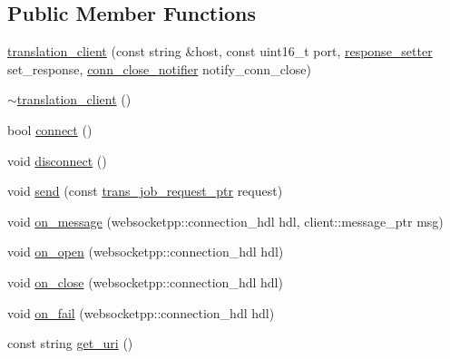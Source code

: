 \subsection*{Public Member Functions}
\begin{DoxyCompactItemize}
\item 
\hyperlink{classuva_1_1smt_1_1bpbd_1_1client_1_1translation__client_ae892d7cccc21df88b04e9d26c4f8c23c}{translation\+\_\+client} (const string \&host, const uint16\+\_\+t port, \hyperlink{classuva_1_1smt_1_1bpbd_1_1client_1_1translation__client_aee49acfd2764e30f042c29b1d365f21d}{response\+\_\+setter} set\+\_\+response, \hyperlink{classuva_1_1smt_1_1bpbd_1_1client_1_1translation__client_a6bb76738c95be98f5d13370d8e6a1176}{conn\+\_\+close\+\_\+notifier} notify\+\_\+conn\+\_\+close)
\item 
\hyperlink{classuva_1_1smt_1_1bpbd_1_1client_1_1translation__client_ad3e2c66b9740dafbcbb1dd2be2cc8116}{$\sim$translation\+\_\+client} ()
\item 
bool \hyperlink{classuva_1_1smt_1_1bpbd_1_1client_1_1translation__client_a84545fb376d8deb41ce74b552ca5d9a0}{connect} ()
\item 
void \hyperlink{classuva_1_1smt_1_1bpbd_1_1client_1_1translation__client_a3112325b486803b3e788b6f3ff3ad755}{disconnect} ()
\item 
void \hyperlink{classuva_1_1smt_1_1bpbd_1_1client_1_1translation__client_a38bf3e2d812a0d7fe12a3f3f5f6af7e3}{send} (const \hyperlink{namespaceuva_1_1smt_1_1bpbd_1_1common_1_1messaging_af373ab262c0cab837c6ebe5e2eb62ea2}{trans\+\_\+job\+\_\+request\+\_\+ptr} request)
\item 
void \hyperlink{classuva_1_1smt_1_1bpbd_1_1client_1_1translation__client_a2249d6ab4f4dd15a37703d7796a60c48}{on\+\_\+message} (websocketpp\+::connection\+\_\+hdl hdl, client\+::message\+\_\+ptr msg)
\item 
void \hyperlink{classuva_1_1smt_1_1bpbd_1_1client_1_1translation__client_a1103c5f24564a2d96484c1cd0042946e}{on\+\_\+open} (websocketpp\+::connection\+\_\+hdl hdl)
\item 
void \hyperlink{classuva_1_1smt_1_1bpbd_1_1client_1_1translation__client_ad37d08d88eff9a5eadf5ce26dc01b80a}{on\+\_\+close} (websocketpp\+::connection\+\_\+hdl hdl)
\item 
void \hyperlink{classuva_1_1smt_1_1bpbd_1_1client_1_1translation__client_a749abfbb48da4b4afeb9059f8444bbba}{on\+\_\+fail} (websocketpp\+::connection\+\_\+hdl hdl)
\item 
const string \hyperlink{classuva_1_1smt_1_1bpbd_1_1client_1_1translation__client_a3eda42ede736d896f012aabefaabad69}{get\+\_\+uri} ()
\end{DoxyCompactItemize}
